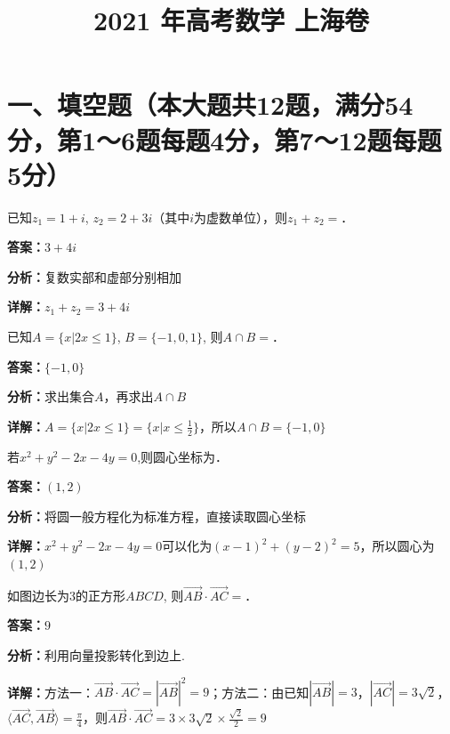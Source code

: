 ﻿\title{2021 年高考数学 上海卷}
\date{}
\maketitle

\section*{一、填空题（本大题共12题，满分54分，第1～6题每题4分，第7～12题每题5分）}

\begin{question}[points=4]
已知$z_1=1+i$, $z_2=2+3i$（其中$i$为虚数单位），则$z_1+z_2=$．
\fillin[{$3+4i$}]
\begin{solution}
\textbf{答案：}$3+4i$

\textbf{分析：}复数实部和虚部分别相加

\textbf{详解：}$z_1+z_2=3+4i$
\end{solution}
\end{question}

\begin{question}[points=4]
已知$A=\{x|2x\le 1\}$, $B=\{-1,0,1\}$, 则$A\cap B=$．
\fillin[{$\{-1,0\}$}]
\begin{solution}
\textbf{答案：}$\{-1,0\}$

\textbf{分析：}求出集合$A$，再求出$A\cap B$

\textbf{详解：}$A=\{x|2x\le 1\}=\{x|x\le \frac{1}{2}\}$，所以$A\cap B=\{-1,0\}$
\end{solution}
\end{question}

\begin{question}[points=4]
若$x^2+y^2-2x-4y=0$,则圆心坐标为．
\fillin[{$(1,2)$}]
\begin{solution}
\textbf{答案：}$(1,2)$

\textbf{分析：}将圆一般方程化为标准方程，直接读取圆心坐标

\textbf{详解：}$x^2+y^2-2x-4y=0$可以化为$(x-1)^2+(y-2)^2=5$，所以圆心为$(1,2)$
\end{solution}
\end{question}

\begin{question}[points=4]
如图边长为3的正方形$ABCD$, 则$\overrightarrow{AB}\cdot\overrightarrow{AC}=$．
\fillin[{$9$}]
\begin{solution}
\textbf{答案：}$9$

\textbf{分析：}利用向量投影转化到边上.

\textbf{详解：}方法一：$\overrightarrow{AB}\cdot\overrightarrow{AC}=|\overrightarrow{AB}|^2=9$；方法二：由已知$|\overrightarrow{AB}|=3$，$|\overrightarrow{AC}|=3\sqrt{2}$，$\langle\overrightarrow{AC},\overrightarrow{AB}\rangle=\frac{\pi}{4}$，则$\overrightarrow{AB}\cdot\overrightarrow{AC}=3\times3\sqrt{2}\times\frac{\sqrt{2}}{2}=9$
\end{solution}
\end{question}

